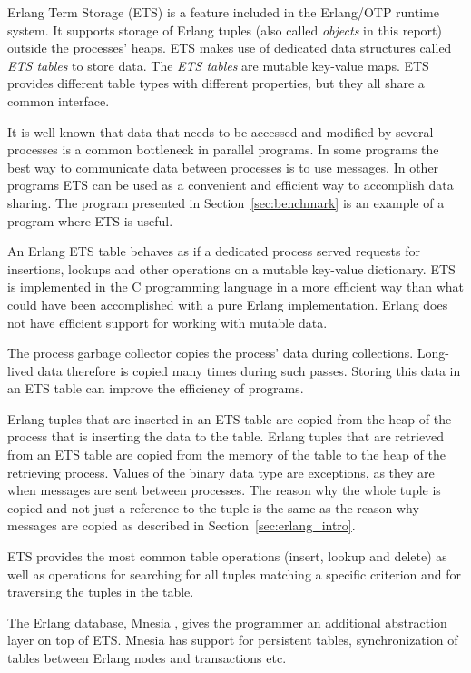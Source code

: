\documentclass[aps,pre,preprint,nofootinbib]{revtex4}
\begin{document}
Erlang Term Storage (ETS) is a feature included in the Erlang/OTP runtime system.
It supports storage of Erlang tuples (also called \emph{objects} in this report) outside the processes' heaps.
ETS makes use of dedicated data structures called \emph{ETS tables} to store data.
The \emph{ETS tables} are mutable key-value maps.
ETS provides different table types with different properties, but they all share a common interface.

It is well known that data that needs to be accessed and modified by several processes is a common bottleneck in parallel programs.
In some programs the best way to communicate data between processes is to use messages.
In other programs ETS can be used as a convenient and efficient way to accomplish data sharing. 
The program presented in Section~\ref{sec:benchmark} is an example of a program where ETS is useful.

An Erlang ETS table behaves as if a dedicated process served requests for insertions, lookups and other operations on a mutable key-value dictionary.
ETS is implemented in the C programming language in a more efficient way than what could have been accomplished with a pure Erlang implementation.
Erlang does not have efficient support for working with mutable data.
 
The process garbage collector copies the process' data during collections.
Long-lived data therefore is copied many times during such passes. 
Storing this data in an ETS table can improve the efficiency of programs.


Erlang tuples that are inserted in an ETS table are copied from the heap of the process that is inserting the data to the table.
Erlang tuples that are retrieved from an ETS table are copied from the memory of the table to the heap of the retrieving process.
Values of the binary data type are exceptions, as they are when messages are sent between processes.
The reason why the whole tuple is copied and not just a reference to the tuple is the same as the reason why messages are copied as described in Section~\ref{sec:erlang_intro}.

ETS provides the most common table operations (insert, lookup and delete) as well as operations for searching for all tuples matching a specific criterion and for traversing the tuples in the table.

The Erlang database, Mnesia \cite{mattsson1998mnesia}, gives the programmer an additional abstraction layer on top of ETS. 
Mnesia has support for persistent tables, synchronization of tables between Erlang nodes and transactions etc.
\end{document}
